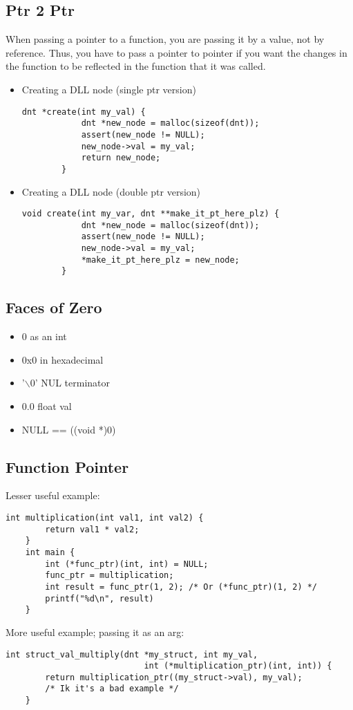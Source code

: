\documentclass{article}
\begin{document}
\subsection{Ptr 2 Ptr}
When passing a pointer to a function, you are passing it by a value, not by reference. Thus, you have to pass a pointer to pointer if you want the changes in the function to be reflected in the function that it was called.
\begin{itemize}
    \item Creating a DLL node (single ptr version)
    \begin{lstlisting}[style=CStyle]
        dnt *create(int my_val) {
            dnt *new_node = malloc(sizeof(dnt));
            assert(new_node != NULL);
            new_node->val = my_val;
            return new_node;
        }
    \end{lstlisting}
    \item Creating a DLL node (double ptr version)
    \begin{lstlisting}[style=CStyle]
        void create(int my_var, dnt **make_it_pt_here_plz) {
            dnt *new_node = malloc(sizeof(dnt));
            assert(new_node != NULL);
            new_node->val = my_val;
            *make_it_pt_here_plz = new_node;
        }
    \end{lstlisting}
\end{itemize}

\subsection{Faces of Zero}
\begin{itemize}
    \item 0 as an int
    \item 0x0 in hexadecimal
    \item '$\backslash$0' NUL terminator
    \item 0.0 float val
    \item NULL == ((void *)0)
\end{itemize}

\subsection{Function Pointer}
Lesser useful example:
\begin{lstlisting}[style=CStyle]
    int multiplication(int val1, int val2) {
        return val1 * val2;
    }
    int main {
        int (*func_ptr)(int, int) = NULL;
        func_ptr = multiplication;
        int result = func_ptr(1, 2); /* Or (*func_ptr)(1, 2) */
        printf("%d\n", result)
    }
\end{lstlisting}
More useful example; passing it as an arg:
\begin{lstlisting}[style=CStyle]
    int struct_val_multiply(dnt *my_struct, int my_val, 
                            int (*multiplication_ptr)(int, int)) {
        return multiplication_ptr((my_struct->val), my_val);
        /* Ik it's a bad example */
    }
\end{lstlisting}
\end{document}
